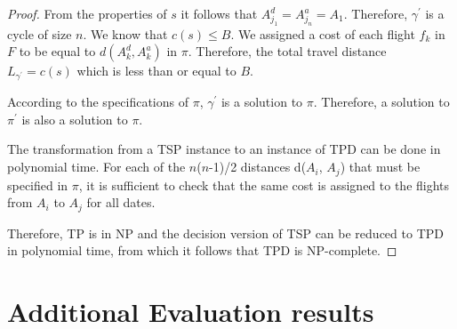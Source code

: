 \documentclass{mpaper}
\begin{document}
\begin{proof}
From the properties of $s$ it follows that $A^{d}_{j_{1}} = A^{a}_{j_{n}} = A_{1}$. Therefore, $\gamma^{\prime}$ is a cycle of size $n$. We know that $c(s) \leq B$. We assigned a cost of each flight $f_{k}$ in $F$ to be equal to $d(A^{d}_{k}, A^{a}_{k})$ in $\pi$. Therefore, the total travel distance $L_{\gamma^{\prime}} = c(s)$ which is less than or equal to $B$.

According to the specifications of $\pi$, $\gamma^{\prime}$ is a solution to $\pi$. Therefore, a solution to $\pi^{\prime}$ is also a solution to $\pi$.

The transformation from a TSP instance to an instance of TPD can be done in polynomial time. For each of the $n$($n$-1)/2 distances d($A_{i}$, $A_{j}$) that must be specified in $\pi$, it is sufficient to check that the same cost is assigned to the flights from $A_{i}$ to $A_{j}$ for all dates.

Therefore, TP is in NP and the decision version of TSP can be reduced to TPD in polynomial time, from which it follows that TPD is NP-complete.
\end{proof}

\section{Additional Evaluation results}
\label{appendix:evaluation}
\end{document}
